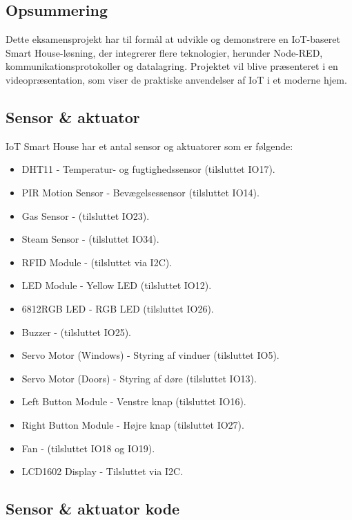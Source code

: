 \subsection*{Opsummering}
Dette eksamensprojekt har til formål at udvikle og demonstrere en IoT-baseret Smart House-løsning, der integrerer flere teknologier, herunder Node-RED, kommunikationsprotokoller og datalagring. Projektet vil blive præsenteret i en videopræsentation, som viser de praktiske anvendelser af IoT i et moderne hjem.

\subsection*{Sensor \& aktuator}
IoT Smart House har et antal sensor og aktuatorer som er følgende:
\begin{itemize}
	\item DHT11 - Temperatur- og fugtighedssensor (tilsluttet IO17).
	\item PIR Motion Sensor - Bevægelsessensor (tilsluttet IO14).
	\item Gas Sensor - (tilsluttet IO23).
	\item Steam Sensor - (tilsluttet IO34).
	\item RFID Module - (tilsluttet via I2C).
	\item LED Module - Yellow LED (tilsluttet IO12).
	\item 6812RGB LED - RGB LED (tilsluttet IO26).
	\item Buzzer - (tilsluttet IO25).
	\item Servo Motor (Windows) - Styring af vinduer (tilsluttet IO5).
	\item Servo Motor (Doors) - Styring af døre (tilsluttet IO13).
	\item Left Button Module - Venstre knap (tilsluttet IO16).
	\item Right Button Module - Højre knap (tilsluttet IO27).
	\item Fan - (tilsluttet IO18 og IO19).
	\item LCD1602 Display - Tilsluttet via I2C.
\end{itemize}

\clearpage

\subsection*{Sensor \& aktuator kode}
